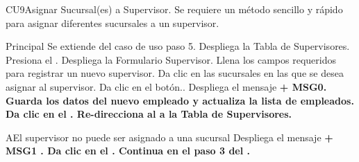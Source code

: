 \begin{UseCase}{CU9}{Asignar Sucursal(es) a Supervisor.}{
		Se requiere un método sencillo y rápido para asignar diferentes sucursales a un supervisor.
	}
	\end{UseCase}
	\begin{UCtrayectoria}{Principal}
		\UCpaso Se extiende del caso de uso  paso 5.
		\UCpaso Despliega la  {Tabla de Supervisores}.
		\UCpaso[\UCactor] Presiona el .
		\UCpaso Despliega la  {Formulario Supervisor}.
		\UCpaso [\UCactor] Llena los campos requeridos para registrar un nuevo supervisor. 
		\UCpaso [\UCactor] Da clic en las sucursales en las que se desea asignar al supervisor.
		\UCpaso [\UCactor] Da clic en el botón..
		\UCpaso Despliega el mensaje \bf {+ MSG0}. 
		\UCpaso Guarda los datos del nuevo empleado y actualiza la lista de empleados.
		\UCpaso[\UCactor] Da clic en el .
		\UCpaso Re-direcciona al \UCactor a la  {Tabla de Supervisores}.
	
	\end{UCtrayectoria}


		\begin{UCtrayectoriaA}{A}{El supervisor no puede ser asignado a una sucursal}
			\UCpaso Despliega el mensaje \bf {+ MSG1 }.
			\UCpaso[\UCactor] Da clic en el .
			\UCpaso Continua en el paso 3 del .
		\end{UCtrayectoriaA}

